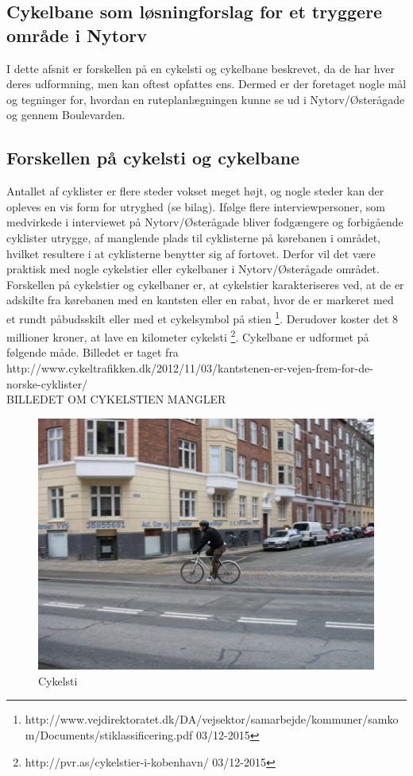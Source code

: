 \subsection{Cykelbane som løsningforslag for et tryggere område i Nytorv}
\label{sub:Cykelbane_som_loesningforslag_for_et_tryggere_omraade_i_Nytorv}
I dette afsnit er forskellen på en cykelsti og cykelbane beskrevet, da de har hver deres udformning, men kan oftest opfattes ens.  Dermed er der foretaget nogle mål og tegninger for, hvordan en ruteplanlægningen kunne se ud i Nytorv/Østerågade og gennem Boulevarden. 

\subsection{Forskellen på cykelsti og cykelbane}
\label{forskelpaacykelsti}
Antallet af cyklister er flere steder vokset meget højt, og nogle steder kan der opleves en vis form for utryghed (se bilag). Ifølge flere interviewpersoner, som medvirkede i interviewet på Nytorv/Østerågade bliver fodgængere og forbigående cyklister utrygge, af manglende plads til cyklisterne på kørebanen i området, hvilket resultere i at cyklisterne benytter sig af fortovet. Derfor vil det være praktisk med nogle cykelstier eller cykelbaner i Nytorv/Østerågade området. 
Forskellen på cykelstier og cykelbaner er, at cykelstier karakteriseres ved, at de er adskilte fra kørebanen med en kantsten eller en rabat, hvor de er markeret med et rundt påbudsskilt eller med et cykelsymbol på stien \footnote{http://www.vejdirektoratet.dk/DA/vejsektor/samarbejde/kommuner/samkom/Documents/stiklassificering.pdf 03/12-2015}.  Derudover koster det 8 millioner kroner, at lave en kilometer cykelsti \footnote{http://pvr.as/cykelstier-i-kobenhavn/ 03/12-2015}.  Cykelbane er udformet på følgende måde. Billedet er taget fra  
http://www.cykeltrafikken.dk/2012/11/03/kantstenen-er-vejen-frem-for-de-norske-cyklister/
\\

BILLEDET OM CYKELSTIEN MANGLER
\begin{figure}[htbp]
   \label{fig:Cykelsti}
   \centering
   \begin{adjustbox}{max width=\textwidth}
     \includegraphics[scale=0.5]{billederogfigur/cykelsti.png}
  \end{adjustbox}
   \caption{Cykelsti}
 \end{figure}



